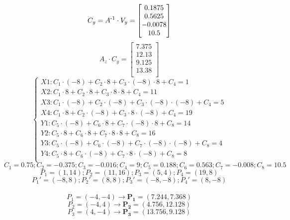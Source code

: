 \[
C_y = A\textsuperscript{-1} \cdot V_y = 
\begin{bmatrix}
   0.1875\\
   0.5625\\
   -0.0078\\
   10.5\\
\end{bmatrix}
\]
\vspace{0.3cm}
\[
A_z \cdot C_y = 
\begin{bmatrix}
   7.375\\
   12.13\\
   9.125\\
   13.38\\
\end{bmatrix}
\]
\noindent{}
\[
\begin{cases}
X1: C_1 \cdot (-8) + C_2 \cdot 8 + C_3 \cdot (-8) \cdot 8 + C_4 = 1 \\
X2: C_1 \cdot 8 + C_2 \cdot 8 + C_3 \cdot 8 \cdot 8 + C_4 = 11 \\
X3: C_1 \cdot (-8) + C_2 \cdot (-8) + C_3 \cdot (-8) \cdot (-8) + C_4 = 5 \\
X4: C_1 \cdot 8 + C_2 \cdot (-8) + C_3 \cdot 8 \cdot (-8) + C_4 = 19 \\
Y1: C_5 \cdot (-8) + C_6 \cdot 8 + C_7 \cdot (-8) \cdot 8 + C_8 = 14 \\
Y2: C_5 \cdot 8 + C_6 \cdot 8 + C_7 \cdot 8 \cdot 8 + C_8 = 16 \\
Y3: C_5 \cdot (-8) + C_6 \cdot (-8) + C_7 \cdot (-8) \cdot (-8) + C_8 = 4 \\
Y4: C_5 \cdot 8 + C_6 \cdot (-8) + C_7 \cdot 8 \cdot (-8) + C_8 = 8 \\
\end{cases}
\]
\noindent{}
\vspace{0.3cm}
\[
C_1 = 0.75; C_2 = -0.375;
C_3 = -0.016; C_4 = 9;
C_5 = 0.188; C_6 = 0.563;
C_7 = -0.008; C_8 = 10.5
\]
\vspace{0.3cm}
\[
P_1 = (1, 14); P_2 = (11, 16);
P_3 = (5, 4); P_4 = (19, 8)
\]
\vspace{0.3cm}
\[
P_1' = (-8, 8); P_2' = (8, 8);
P_3' = (-8, -8); P_4' = (8, -8)
\]\\
\vspace{0.5cm}
\noindent{}
\[
P_1 = (-4, -4) \rightarrow \mathbf{P_1 = (7.244, 7.368)}
\]
\[
P_2 = (-4, 4) \rightarrow \mathbf{P_2 = (4.756, 12.128)}
\]
\[
P_3 = (4, -4) \rightarrow \mathbf{P_3 = (13.756, 9.128)}
\]
